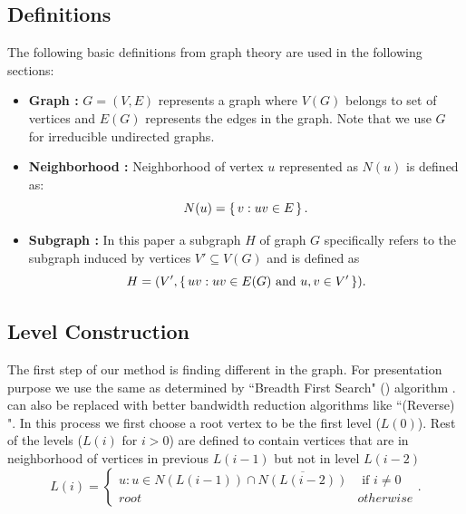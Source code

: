 \subsection*{Definitions}
The following basic definitions from graph theory are used in the following sections:
\begin{itemize}
	\item \textbf{Graph : } $G = (V,E)$ represents a graph where $V(G)$ belongs to set of vertices and $E(G)$ represents the edges in the graph. Note that we use $G$ for irreducible undirected graphs.
	\item \textbf{Neighborhood :} Neighborhood of vertex $u$ represented as $N(u)$ is defined as:
	\begin{equation*}
	  N(u) = \set{ v : uv \in E}.
	\end{equation*}
	\item \textbf{Subgraph :} In this paper a subgraph $H$ of graph $G$ specifically refers to the subgraph induced by vertices $V' \subseteq V(G)$ and is defined as
	\begin{equation*}
		H = (V', \set{ uv : uv \in E(G) \text{ and } u,v \in V'}).
	\end{equation*}
\end{itemize}

\subsection{Level Construction}\label{subsec:LEVEL_CONST}
The first step of our \RACE method is finding different \levels in the graph. For presentation purpose we use the same \levels as determined by ``Breadth First Search" (\BFS) algorithm \cite{BFS}. \BFS can also be replaced with better bandwidth reduction algorithms like ``(Reverse) \CMfull".  In this process we first choose a root vertex to be the first level ($L(0)$). Rest of the levels ($L(i)$ for $i > 0$) are defined to  contain vertices that are in neighborhood of vertices in previous \level $L(i-1)$ but not in level $L(i-2)$ \cite{BFS_level_def} \ie
\begin{equation}\label{eq:level}
L(i) = 
\begin{cases}
	  u : u \in N(L(i-1)) \cap \overline{N(L(i-2))}  & \text{ if } i \neq 0 \\
	 root & otherwise
\end{cases}   
 .
\end{equation}

